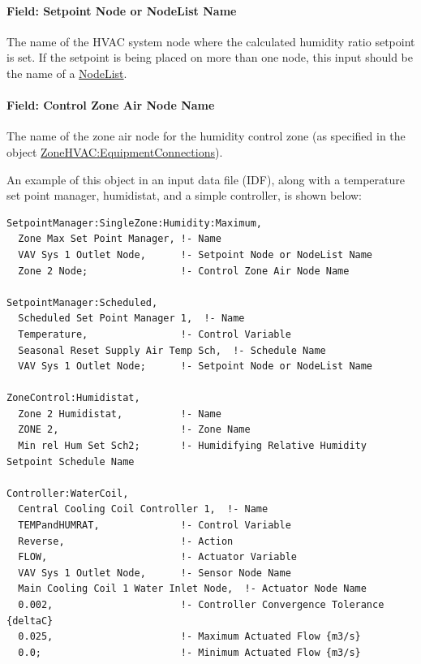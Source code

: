 \paragraph{Field: Setpoint Node or NodeList Name}\label{field-setpoint-node-or-nodelist-name-7}

The name of the HVAC system node where the calculated humidity ratio setpoint is set. If the setpoint is being placed on more than one node, this input should be the name of a \hyperref[nodelist]{NodeList}.

\paragraph{Field: Control Zone Air Node Name}\label{field-control-zone-air-node-name-1}

The name of the zone air node for the humidity control zone (as specified in the object \hyperref[zonehvacequipmentconnections]{ZoneHVAC:EquipmentConnections}).

An example of this object in an input data file (IDF), along with a temperature set point manager, humidistat, and a simple controller, is shown below:

\begin{lstlisting}
SetpointManager:SingleZone:Humidity:Maximum,
  Zone Max Set Point Manager, !- Name
  VAV Sys 1 Outlet Node,      !- Setpoint Node or NodeList Name
  Zone 2 Node;                !- Control Zone Air Node Name

SetpointManager:Scheduled,
  Scheduled Set Point Manager 1,  !- Name
  Temperature,                !- Control Variable
  Seasonal Reset Supply Air Temp Sch,  !- Schedule Name
  VAV Sys 1 Outlet Node;      !- Setpoint Node or NodeList Name

ZoneControl:Humidistat,
  Zone 2 Humidistat,          !- Name
  ZONE 2,                     !- Zone Name
  Min rel Hum Set Sch2;       !- Humidifying Relative Humidity Setpoint Schedule Name

Controller:WaterCoil,
  Central Cooling Coil Controller 1,  !- Name
  TEMPandHUMRAT,              !- Control Variable
  Reverse,                    !- Action
  FLOW,                       !- Actuator Variable
  VAV Sys 1 Outlet Node,      !- Sensor Node Name
  Main Cooling Coil 1 Water Inlet Node,  !- Actuator Node Name
  0.002,                      !- Controller Convergence Tolerance {deltaC}
  0.025,                      !- Maximum Actuated Flow {m3/s}
  0.0;                        !- Minimum Actuated Flow {m3/s}
\end{lstlisting}

